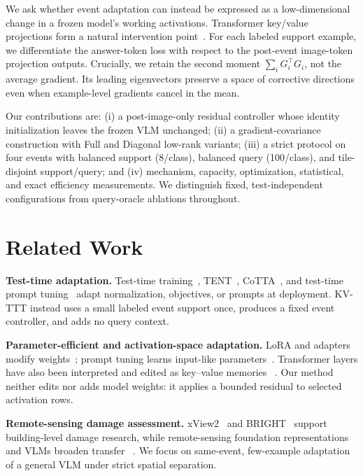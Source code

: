 \documentclass[conference]{IEEEtran}
\newcommand{\KVTTT}{\textsc{KV-TTT}}
\begin{document}
We ask whether event adaptation can instead be expressed as a low-dimensional
change in a frozen model's working activations. Transformer key/value projections
form a natural intervention point~\cite{vaswani2017attention,geva2021kv}. For
each labeled support example, we differentiate the answer-token loss with
respect to the post-event image-token projection outputs. Crucially, we retain
the second moment $\sum_iG_i^\top G_i$, not the average gradient. Its leading
eigenvectors preserve a space of corrective directions even when example-level
gradients cancel in the mean.

Our contributions are: (i) a post-image-only residual controller whose identity
initialization leaves the frozen VLM unchanged; (ii) a gradient-covariance
construction with Full and Diagonal low-rank variants; (iii) a strict protocol
on four events with balanced support (8/class), balanced query (100/class), and
tile-disjoint support/query; and (iv) mechanism, capacity, optimization,
statistical, and exact efficiency measurements. We distinguish fixed,
test-independent configurations from query-oracle ablations throughout.

\section{Related Work}
\textbf{Test-time adaptation.} Test-time training~\cite{sun2020ttt},
TENT~\cite{wang2020tent}, CoTTA~\cite{wang2022cotta}, and test-time prompt
tuning~\cite{shu2022tpt} adapt normalization, objectives, or prompts at
deployment. \KVTTT{} instead uses a small labeled event support once, produces a
fixed event controller, and adds no query context.

\textbf{Parameter-efficient and activation-space adaptation.} LoRA and
adapters modify weights~\cite{hu2021lora,houlsby2019adapters}; prompt tuning
learns input-like parameters~\cite{lester2021prompt}. Transformer layers have
also been interpreted and edited as key--value memories
~\cite{geva2021kv,meng2022rome,meng2023memit}. Our method neither edits nor
adds model weights: it applies a bounded residual to selected activation rows.

\textbf{Remote-sensing damage assessment.} xView2~\cite{gupta2021xview} and
\textsc{BRIGHT}~\cite{bright2024} support building-level damage research, while
remote-sensing foundation representations and VLMs broaden transfer
~\cite{ravi2023satmae,bhatia2024rerank}. We focus on same-event, few-example
adaptation of a general VLM under strict spatial separation.
\end{document}
